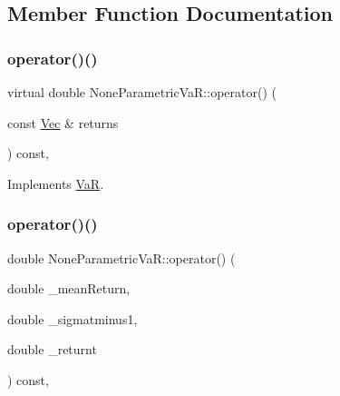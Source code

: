\subsection{Member Function Documentation}
\hypertarget{classNoneParametricVaR_a181d6152dcbdc7ce323e5d4b672a14f8}{}\label{classNoneParametricVaR_a181d6152dcbdc7ce323e5d4b672a14f8} 
\subsubsection{\texorpdfstring{operator()()}{operator()()}\hspace{0.1cm}{\footnotesize\ttfamily [1/3]}}
{\footnotesize\ttfamily virtual double None\+Parametric\+Va\+R\+::operator() (\begin{DoxyParamCaption}\item[{const \hyperlink{compute__returns__eigen_8h_a1eb6a9306ef406d7975f3cbf2e247777}{Vec} \&}]{returns }\end{DoxyParamCaption}) const\hspace{0.3cm}{\ttfamily [inline]}, {\ttfamily [virtual]}}



Implements \hyperlink{classVaR_a1bd868d9953bfaeb49f5bf7d16986631}{VaR}.

\hypertarget{classNoneParametricVaR_ab22e4237802535880a932097aeaf003b}{}\label{classNoneParametricVaR_ab22e4237802535880a932097aeaf003b} 
\subsubsection{\texorpdfstring{operator()()}{operator()()}\hspace{0.1cm}{\footnotesize\ttfamily [2/3]}}
{\footnotesize\ttfamily double None\+Parametric\+Va\+R\+::operator() (\begin{DoxyParamCaption}\item[{double}]{\+\_\+mean\+Return,  }\item[{double}]{\+\_\+sigmatminus1,  }\item[{double}]{\+\_\+returnt }\end{DoxyParamCaption}) const\hspace{0.3cm}{\ttfamily [inline]}, {\ttfamily [virtual]}}



